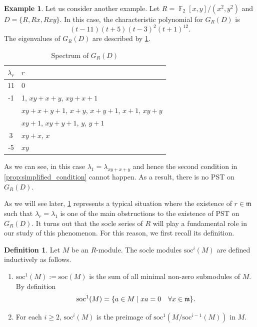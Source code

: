\documentclass[12pt, a4paper]{amsart}
\theoremstyle{definition}
\newtheorem{definition}[thm]{Definition}
\newtheorem{expl}[thm]{Example}
\DeclareMathOperator{\F}{\mathbb{F}}
\numberwithin{equation}{section}
\newcommand{\soc}{{{\rm soc}}}
\begin{document}
\begin{expl} \label{expl:second}
Let us consider another example. Let $R=\F_2[x,y]/(x^2, y^2)$ and $D=\{R, Rx, Rxy\}.$ In this case, the characteristic polynomial for $G_{R}(D)$ is 
\[ (t - 11) (t + 5)  (t - 3)^2 (t + 1)^{12} .\] 
The eigenvalues of $G_R(D)$ are described by \cref{tab:dictionary2}. 

\begin{table}[h]
    \centering
    \begin{tabular}{|c|l|}
        \hline
        \textbf{$\lambda_r$} & $r$ \\
        \hline
        11 & 0 \\
        \hline
        -1 & 1, $xy + x + y$, $xy + x + 1$ \\
        & $xy + x + y + 1$, $x + y$, $x + y + 1$, $x + 1$, $xy + y$ \\
        & $xy + 1$, $xy + y + 1$, $y$, $y + 1$ \\
        \hline
        3 & $xy + x$, $x$ \\
        \hline
        -5 & $xy$ \\
        \hline
    \end{tabular}
    \caption{Spectrum of $G_{R}(D)$}
    \label{tab:dictionary2}
\end{table}
As we can see, in this case $\lambda_{1} = \lambda_{xy+x+y}$ and hence the second condition in \cref{prop:simplified_condition} cannot happen. As a result, there is no PST on $G_{R}(D).$
\end{expl}

As we will see later, \cref{expl:second} represents a typical situation where the existence of  $r \in \mathfrak{m}$ such that $\lambda_r = \lambda_1$ is one of the main obstructions to the existence of PST on $G_{R}(D)$. It turns out that the socle series of $R$ will play a fundamental role in our study of this phenomenon. For this reason, we first recall its definition. 
\begin{definition} \label{def:soc}
    Let $M$ be an $R$-module. The socle modules $\text{soc}^{i}(M)$ are defined inductively as follows. 
    \begin{enumerate}
        \item $\text{soc}^{1}(M):=\text{soc}(M)$ is the sum of all minimal non-zero submodules of $M.$ By definition 
        \[ \soc^{1}(M) = \{a \in M \mid xa = 0 \quad \forall x \in \mathfrak{m} \} .\]
        \item For each $i \geq 2$, $\text{soc}^{i}(M)$ is the preimage of $\text{soc}^1(M/\text{soc}^{i-1}(M))$ in $M.$ 
    \end{enumerate}
\end{definition}
\end{document}

